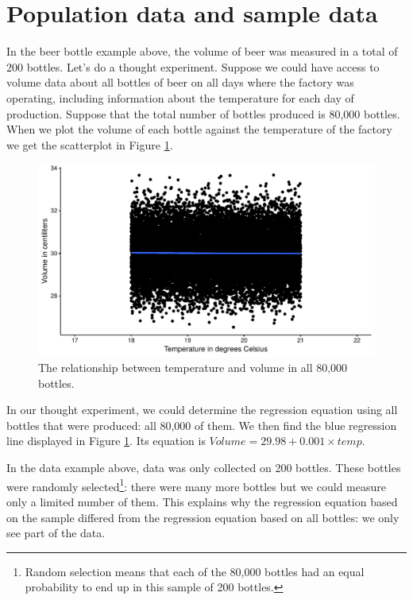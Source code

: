 \documentclass[]{book}\usepackage[]{graphicx}\usepackage[]{color}
\makeatletter
\def\maxwidth{ %
  \ifdim\Gin@nat@width>\linewidth
    \linewidth
  \else
    \Gin@nat@width
  \fi
}
\newenvironment{knitrout}{}{} %
\makeatother
\begin{document}
\section{Population data and sample data}

In the beer bottle example above, the volume of beer was measured in a total of 200 bottles. Let's do a thought experiment. Suppose we could have access to volume data about all bottles of beer on all days where the factory was operating, including information about the temperature for each day of production. Suppose that the total number of bottles produced is 80,000 bottles. When we plot the volume of each bottle against the temperature of the factory we get the scatterplot in Figure \ref{fig:inf_1}.


\begin{knitrout}
\color{fgcolor}\begin{figure}

{\centering \includegraphics[width=\maxwidth]{figure/inf_1-1} 

}

\caption[The relationship between temperature and volume in all 80,000 bottles]{The relationship between temperature and volume in all 80,000 bottles.}\label{fig:inf_1}
\end{figure}


\end{knitrout}


In our thought experiment, we could determine the regression equation using all bottles that were produced: all 80,000 of them. We then find the blue regression line displayed in Figure \ref{fig:inf_1}. Its equation is $Volume = 29.98 + 0.001 \times temp$.


In the data example above, data was only collected on 200 bottles. These bottles were randomly selected\footnote{Random selection means that each of the 80,000 bottles had an equal probability to end up in this sample of 200 bottles.}: there were many more bottles but we could measure only a limited number of them. This explains why the regression equation based on the sample differed from the regression equation based on all bottles: we only see part of the data.
\end{document}
